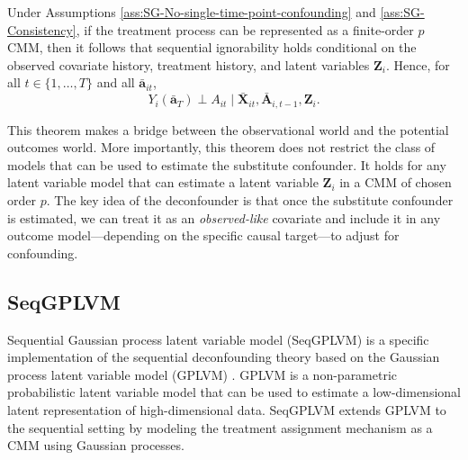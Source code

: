  \begin{theorem}
    Under Assumptions 
    \ref{ass:SG-No-single-time-point-confounding} and 
    \ref{ass:SG-Consistency}, if the treatment process can be 
    represented as a finite-order \(p\) CMM, then it follows 
    that sequential ignorability holds conditional on the observed covariate history, treatment history, and latent variables \(\mathbf{Z}_i\). Hence, for all \(t \in \{1,\ldots,T\}\) and all \(\bar{\mathbf{a}}_{it}\),
\begin{equation}
    \label{eq:seqgplvm-single-unit-seqignorability}
    Y_i(\bar{\mathbf{a}}_T) \perp A_{it} \mid \bar{\mathbf{X}}_{it}, \bar{\mathbf{A}}_{i,t-1}, \mathbf{Z}_i .
\end{equation}

 \end{theorem}
This theorem makes a bridge between the observational world and the potential outcomes world. 
More importantly, this theorem does not restrict the class of models that can be used to 
estimate the substitute confounder. It holds for any 
latent variable model that can estimate a latent variable $\mathbf{Z}_i$ in a CMM of chosen order $p$. 
The key idea of the deconfounder is that 
once the substitute confounder is estimated, we can 
treat it as an \emph{observed-like} covariate and include it in 
any outcome model---depending on the specific causal target---to adjust for 
confounding. 

\subsection{SeqGPLVM}
Sequential Gaussian process latent variable model (SeqGPLVM) 
is a specific implementation of the sequential deconfounding theory based 
on the Gaussian process latent variable model (GPLVM)
\cite{lawrenceGaussianProcessLatent2003, titsiasBayesianGaussianProcess2010}. 
GPLVM is a non-parametric probabilistic latent variable model that can be 
used to estimate a low-dimensional 
latent representation of high-dimensional data. SeqGPLVM extends 
GPLVM to the sequential setting by modeling the treatment assignment 
mechanism as a CMM using Gaussian processes. 

